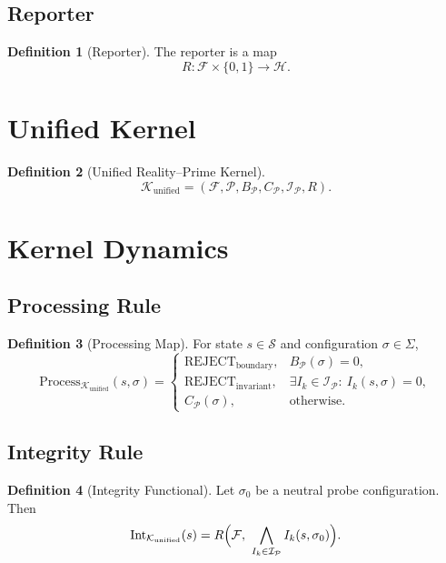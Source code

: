 \documentclass[12pt]{article}
\theoremstyle{definition}
\newtheorem{definition}{Definition}[section]
\theoremstyle{plain}
\begin{document}
\subsection{Reporter}

\begin{definition}[Reporter]
The reporter is a map
\[
R : \mathcal{F} \times \{0,1\} \to \mathcal{H}.
\]
\end{definition}

\section{Unified Kernel}

\begin{definition}[Unified Reality--Prime Kernel]
\[
\mathcal{K}_{\mathrm{unified}} =
(\mathcal{F}, \mathcal{P}, B_{\mathcal{P}}, C_{\mathcal{P}}, \mathcal{I}_{\mathcal{P}}, R).
\]
\end{definition}

\section{Kernel Dynamics}

\subsection{Processing Rule}

\begin{definition}[Processing Map]
For state \(s\in\mathcal{S}\) and configuration \(\sigma\in\Sigma\),
\[
\mathrm{Process}_{\mathcal{K}_{\mathrm{unified}}}(s,\sigma)=
\begin{cases}
\mathrm{REJECT}_{\mathrm{boundary}}, & B_{\mathcal{P}}(\sigma)=0,\\[4pt]
\mathrm{REJECT}_{\mathrm{invariant}}, & \exists I_k\in\mathcal{I}_{\mathcal{P}}:\ I_k(s,\sigma)=0,\\[4pt]
C_{\mathcal{P}}(\sigma), & \text{otherwise}.
\end{cases}
\]
\end{definition}

\subsection{Integrity Rule}

\begin{definition}[Integrity Functional]
Let \(\sigma_0\) be a neutral probe configuration. Then
\[
\mathrm{Int}_{\mathcal{K}_{\mathrm{unified}}}(s) =
R\Bigl(\mathcal{F},\ \bigwedge_{I_k \in \mathcal{I}_{\mathcal{P}}} I_k(s,\sigma_0)\Bigr).
\]
\end{definition}
\end{document}
